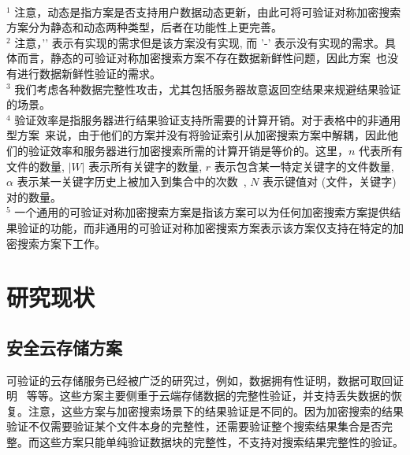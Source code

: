 \begin{table*}[t]
\begin{center}
\begin{tabular}{c c c c c c c}
    \hline
  \end{tabular}\\
  \end{center}
	$^1$ 注意，动态是指方案是否支持用户数据动态更新，由此可将可验证对称加密搜索方案分为静态和动态两种类型，后者在功能性上更完善。\\
  $^2$ 注意，'\texttimes' 表示有实现的需求但是该方案没有实现, 而 '-' 表示没有实现的需求。具体而言，静态的可验证对称加密搜索方案不存在数据新鲜性问题，因此方案~\cite{kurosawa2012uc,chai2012verifiable,cheng2015verifiable,ogataefficient}也没有进行数据新鲜性验证的需求。\\
  $^3$ 我们考虑各种数据完整性攻击，尤其包括服务器故意返回空结果来规避结果验证的场景。\\
  $^4$ 验证效率是指服务器进行结果验证支持所需要的计算开销。对于表格中的非通用型方案~\cite{kurosawa2012uc,chai2012verifiable,kurosawa2013update,stefanov2014practical,cheng2015verifiable}来说，由于他们的方案并没有将验证索引从加密搜索方案中解耦，因此他们的验证效率和服务器进行加密搜索所需的计算开销是等价的。这里，$n$ 代表所有文件的数量, $|W|$ 表示所有关键字的数量, $r$ 表示包含某一特定关键字的文件数量, $\alpha$ 表示某一关键字历史上被加入到集合中的次数~\cite{stefanov2014practical}, $N$ 表示键值对 (文件，关键字) 对的数量。\\
  $^5$ 一个通用的可验证对称加密搜索方案是指该方案可以为任何加密搜索方案提供结果验证的功能，而非通用的可验证对称加密搜索方案表示该方案仅支持在特定的加密搜索方案下工作。\\
\end{table*}


\section{研究现状}
\subsection{安全云存储方案}
可验证的云存储服务已经被广泛的研究过，例如，数据拥有性证明，数据可取回证明~\cite{juels2007pors, bowers2009proofs, stefanov2012iris} 等等。这些方案主要侧重于云端存储数据的完整性验证，并支持丢失数据的恢复。注意，这些方案与加密搜索场景下的结果验证是不同的。因为加密搜索的结果验证不仅需要验证某个文件本身的完整性，还需要验证整个搜索结果集合是否完整。而这些方案只能单纯验证数据块的完整性，不支持对搜索结果完整性的验证。

